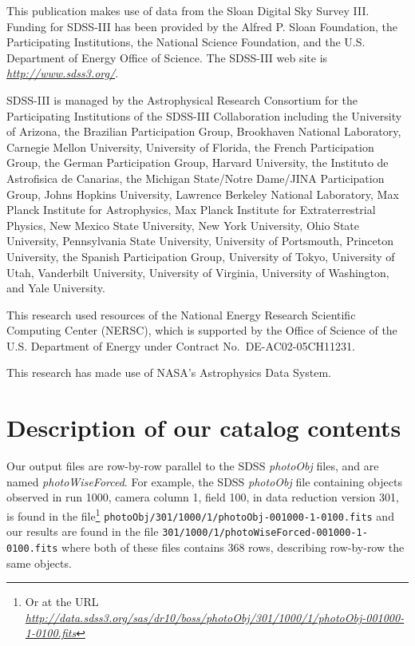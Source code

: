\documentclass[12pt,preprint]{aastex}
\newcommand{\niceurl}[1]{\href{#1}{\textsl{#1}}}
\begin{document}
This publication makes use of data from the Sloan Digital Sky Survey
III.  Funding for SDSS-III has been provided by the Alfred P. Sloan
Foundation, the Participating Institutions, the National Science
Foundation, and the U.S. Department of Energy Office of Science. The
SDSS-III web site is \niceurl{http://www.sdss3.org/}.

SDSS-III is managed by the Astrophysical Research Consortium for the
Participating Institutions of the SDSS-III Collaboration including the
University of Arizona, the Brazilian Participation Group, Brookhaven
National Laboratory, Carnegie Mellon University, University of
Florida, the French Participation Group, the German Participation
Group, Harvard University, the Instituto de Astrofisica de Canarias,
the Michigan State/Notre Dame/JINA Participation Group, Johns Hopkins
University, Lawrence Berkeley National Laboratory, Max Planck
Institute for Astrophysics, Max Planck Institute for Extraterrestrial
Physics, New Mexico State University, New York University, Ohio State
University, Pennsylvania State University, University of Portsmouth,
Princeton University, the Spanish Participation Group, University of
Tokyo, University of Utah, Vanderbilt University, University of
Virginia, University of Washington, and Yale University.

This research used resources of the National Energy Research
Scientific Computing Center (NERSC), which is supported by the Office
of Science of the U.S. Department of Energy under Contract
No.~DE-AC02-05CH11231.

This research has made use of NASA's Astrophysics Data System.


\appendix

\section{Description of our catalog contents}
\label{sec:catalog}

\newcommand{\filetype}[1]{\textsl{#1}}

Our output files are row-by-row parallel to the SDSS
\filetype{photoObj} files, and are named \filetype{photoWiseForced}.
For example, the SDSS \filetype{photoObj} file containing objects
observed in run 1000, camera column 1, field 100, in data reduction
version 301, is found in the file\footnote{Or at the URL
  \niceurl{http://data.sdss3.org/sas/dr10/boss/photoObj/301/1000/1/photoObj-001000-1-0100.fits}}
%
\verb+photoObj/301/1000/1/photoObj-001000-1-0100.fits+
%
and our results are found in the file
%
\verb+301/1000/1/photoWiseForced-001000-1-0100.fits+
%
where both of these files contains 368 rows, describing row-by-row the
same objects.
\end{document}
